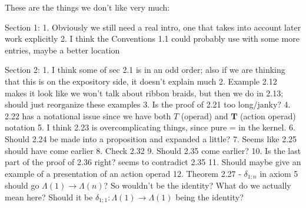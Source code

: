 These are the things we don't like very much:

Section 1:
1. Obviously we still need a real intro, one that takes into account later work explicitly
2. I think the Conventions 1.1 could probably use with some more entries, maybe a better location

Section 2:
1. I think some of sec 2.1 is in an odd order; also if we are thinking that this is on the expository side, it doesn't explain much
2. Example 2.12 makes it look like we won't talk about ribbon braids, but then we do in 2.13; should just reorganize these examples
3. Is the proof of 2.21 too long/janky?
4. 2.22 has a notational issue since we have both $T$ (operad) and $\mathbf{T}$ (action operad) notation
5. I think 2.23 is overcomplicating things, since pure = in the kernel.
6. Should 2.24 be made into a proposition and expanded a little?
7. Seems like 2.25 should have come earlier
8. Check 2.32
9. Should 2.35 come earlier?
10. Is the last part of the proof of 2.36 right? seems to contradict 2.35
11. Should maybe give an example of a presentation of an action operad 
12. Theorem 2.27 - $\delta_{1;n}$ in axiom 5 should go $\Lambda(1) \rightarrow \Lambda(n)$? So wouldn't be the identity? What do we actually mean here? Should it be $\delta_{1;1} \colon \Lambda(1) \rightarrow \Lambda(1)$ being the identity?